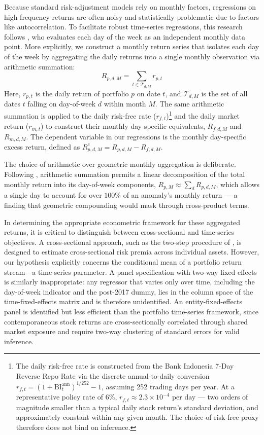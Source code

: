 \documentclass[
	a4paper,
	10pt,
	twoside,
]{LTJournalArticle}
\begin{document}
Because standard risk-adjustment models rely on monthly factors, regressions on high-frequency returns are often noisy and statistically problematic due to factors like autocorrelation. To facilitate robust time-series regressions, this research follows \citet{birru2018}, who evaluates each day of the week as an independent monthly data point. More explicitly, we construct a monthly return series that isolates each day of the week by aggregating the daily returns into a single monthly observation via arithmetic summation:
\begin{equation}
	R_{p, d, M} = \sum_{t \in \mathcal{T}_{d, M}} r_{p,t}
\end{equation}
Here, $r_{p,t}$ is the daily return of portfolio $p$ on date $t$, and $\mathcal{T}_{d, M}$ is the set of all dates $t$ falling on day-of-week $d$ within month $M$. The same arithmetic summation is applied to the daily risk-free rate ($r_{f,t}$)\footnote{The daily risk-free rate is constructed from the Bank Indonesia 7-Day Reverse Repo Rate via the discrete annual-to-daily conversion $r_{f,t} = (1 + \text{BI}_{t}^{\text{ann}})^{1/252} - 1$, assuming 252 trading days per year. At a representative policy rate of $6\%$, $r_{f,t} \approx 2.3 \times 10^{-4}$ per day --- two orders of magnitude smaller than a typical daily stock return's standard deviation, and approximately constant within any given month. The choice of risk-free proxy therefore does not bind on inference.} and the daily market return ($r_{m,t}$) to construct their monthly day-specific equivalents, $R_{f, d, M}$ and $R_{m, d, M}$. The dependent variable in our regressions is the monthly day-specific excess return, defined as $R^{e}_{p, d, M} = R_{p, d, M} - R_{f, d, M}$.

The choice of arithmetic over geometric monthly aggregation is deliberate. Following \citet{birru2018}, arithmetic summation permits a linear decomposition of the total monthly return into its day-of-week components, $R_{p, M} \approx \sum_{d} R_{p, d, M}$, which allows a single day to account for over $100\%$ of an anomaly's monthly return --- a finding that geometric compounding would mask through cross-product terms.

In determining the appropriate econometric framework for these aggregated returns, it is critical to distinguish between cross-sectional and time-series objectives. A cross-sectional approach, such as the two-step procedure of \citet{fama1973}, is designed to estimate cross-sectional risk premia across individual assets. However, our hypothesis explicitly concerns the conditional mean of a portfolio return stream—a time-series parameter. A panel specification with two-way fixed effects is similarly inappropriate: any regressor that varies only over time, including the day-of-week indicator and the post-2017 dummy, lies in the column space of the time-fixed-effects matrix and is therefore unidentified. An entity-fixed-effects panel is identified but less efficient than the portfolio time-series framework, since contemporaneous stock returns are cross-sectionally correlated through shared market exposure and require two-way clustering of standard errors for valid inference. 
\end{document}
